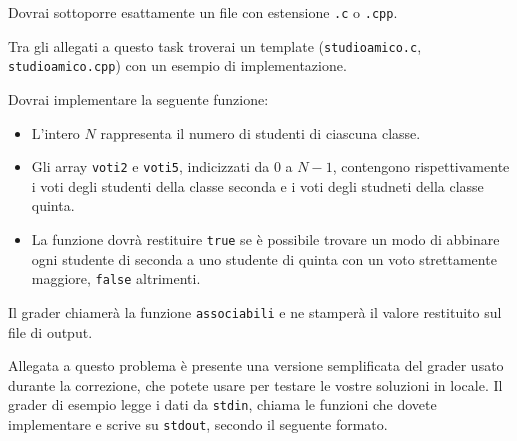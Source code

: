 
\Implementation


Dovrai sottoporre esattamente un file con estensione \texttt{.c} o \texttt{.cpp}.

\begin{warning}
Tra gli allegati a questo task troverai un template (\texttt{studioamico.c}, \texttt{studioamico.cpp}) con un esempio di implementazione.
\end{warning}

Dovrai implementare la seguente funzione:

\begin{itemize}[nolistsep]
	
	\begin{itemize}[nolistsep]
	  \item L'intero $N$ rappresenta il numero di studenti di ciascuna classe.
	  \item Gli array \texttt{voti2} e \texttt{voti5}, indicizzati da $0$ a $N-1$, contengono rispettivamente i voti degli studenti della classe seconda e i voti degli studneti della classe quinta.
      \item La funzione dovrà restituire \texttt{true} se è possibile trovare un modo di abbinare ogni studente di seconda a uno studente di quinta con un voto strettamente maggiore, \texttt{false} altrimenti.

      \end{itemize}
\end{itemize}

\medskip

Il grader chiamerà la funzione \texttt{associabili} e ne stamperà il valore restituito sul file di output.



\Grader
Allegata a questo problema è presente una versione semplificata del grader usato durante la correzione, che potete usare per testare le vostre soluzioni in locale. Il grader di esempio legge i dati da \texttt{stdin}, chiama le funzioni che dovete implementare e scrive su \texttt{stdout}, secondo il seguente formato.

